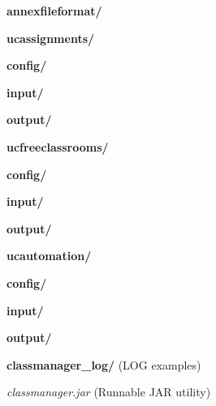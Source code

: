 \begin{description}
    \item \textbf{annexfileformat/}
        \begin{description}
            \item \textbf{ucassignments/}
                \begin{description}
                    \item \textbf{config/}
                    \item \textbf{input/}
                    \item \textbf{output/}
                \end{description}
            \item \textbf{ucfreeclassrooms/}
                \begin{description}
                    \item \textbf{config/}
                    \item \textbf{input/}
                    \item \textbf{output/}
                \end{description}
            \item \textbf{ucautomation/}
                \begin{description}
                    \item \textbf{config/}
                    \item \textbf{input/}
                    \item \textbf{output/}
                \end{description}
            \item \textbf{classmanager\_log/} (LOG examples)
            \item \textit{classmanager.jar} (Runnable JAR utility)
        \end{description}
\end{description}


